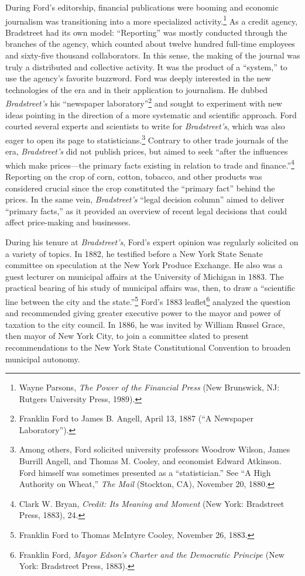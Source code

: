 \documentclass[twoside,symmetric,nobib,justified]{tufte-book}
\begin{document}
During Ford's editorship, financial publications were booming and
economic journalism was transitioning into a more specialized
activity.\footnote{Wayne Parsons, \emph{The Power of the Financial
  Press} (New Brunswick, NJ: Rutgers University Press, 1989).} As a
credit agency, Bradstreet had its own model: ``Reporting'' was mostly
conducted through the branches of the agency, which counted about twelve
hundred full-time employees and sixty-five thousand collaborators. In
this sense, the making of the journal was truly a distributed and
collective activity. It was the product of a ``system,'' to use the
agency's favorite buzzword. Ford was deeply interested in the new
technologies of the era and in their application to journalism. He
dubbed \emph{Bradstreet's} his ``newspaper laboratory''\footnote{Franklin
  Ford to James B. Angell, April 13, 1887 (``A Newspaper Laboratory'').}
and sought to experiment with new ideas pointing in the direction of a
more systematic and scientific approach. Ford courted several experts
and scientists to write for \emph{Bradstreet's}, which was also eager to
open its page to statisticians.\footnote{Among others, Ford solicited
  university professors Woodrow Wilson, James Burrill Angell, and Thomas
  M. Cooley, and economist Edward Atkinson. Ford himself was sometimes
  presented as a ``statistician.'' See ``A High Authority on Wheat,''
  \emph{The Mail} (Stockton, CA), November 20, 1880.} Contrary to other
trade journals of the era, \emph{Bradstreet's} did not publish prices,
but aimed to seek ``after the influences which make prices---the primary
facts existing in relation to trade and finance.''\footnote{Clark W.
  Bryan, \emph{Credit: Its Meaning and Moment} (New York: Bradstreet
  Press, 1883), 24.} Reporting on the crop of corn, cotton, tobacco, and
other products was considered crucial since the crop constituted the
``primary fact'' behind the prices. In the same vein,
\emph{Bradstreet's} ``legal decision column'' aimed to deliver ``primary
facts,'' as it provided an overview of recent legal decisions that could
affect price-making and businesses.

During his tenure at \emph{Bradstreet's}, Ford's expert opinion was
regularly solicited on a variety of topics. In 1882, he testified before
a New York State Senate committee on speculation at the New York Produce
Exchange. He also was a guest lecturer on municipal affairs at the
University of Michigan in 1883. The practical bearing of his study of
municipal affairs was, then, to draw a ``scientific line between the
city and the state.''\footnote{Franklin Ford to Thomas McIntyre Cooley,
  November 26, 1883.} Ford's 1883 leaflet\footnote{Franklin Ford,
  \emph{Mayor Edson's Charter and the Democratic Principe} (New York:
  Bradstreet Press, 1883).} analyzed the question and recommended giving
greater executive power to the mayor and power of taxation to the city
council. In 1886, he was invited by William Russel Grace, then mayor of
New York City, to join a committee slated to present recommendations to
the New York State Constitutional Convention to broaden municipal
autonomy.
\end{document}
